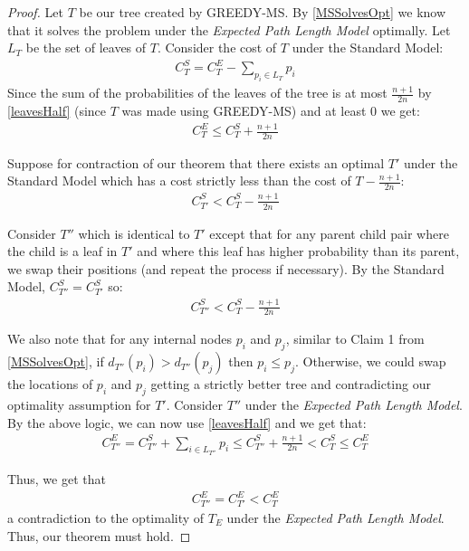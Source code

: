 \documentclass[letterpaper,12pt,titlepage,oneside,final]{book}
\theoremstyle{plain}
\begin{document}
\begin{proof}
Let $T$ be our tree created by GREEDY-MS. By \ref{MSSolvesOpt} we know that it solves the problem under the \textit{Expected Path Length Model} optimally. Let $L_T$ be the set of leaves of $T$. Consider the cost of $T$ under the Standard Model:
\begin{align*}
C^S_T = C^E_T - \sum_{p_i \in L_T} p_i
\end{align*}
Since the sum of the probabilities of the leaves of the tree is at most $\frac{n+1}{2n}$ by \ref{leavesHalf} (since $T$ was made using GREEDY-MS) and at least $0$ we get:
\begin{align*}
C^E_T \leq C^S_T + \frac{n+1}{2n}
\end{align*}

Suppose for contraction of our theorem that there exists an optimal $T'$ under the Standard Model which has a cost strictly less than the cost of $T-\frac{n+1}{2n}$:
\begin{align*}
C^S_{T'} < C^S_T - \frac{n+1}{2n}
\end{align*}

Consider $T''$ which is identical to $T'$ except that for any parent child pair where the child is a leaf in $T'$ and where this leaf has higher probability than its parent, we swap their positions (and repeat the process if necessary). By the Standard Model, $C^S_{T''} = C^S_{T'}$ so:
\begin{align*}
C^S_{T''} < C^S_T - \frac{n+1}{2n}
\end{align*} 

We also note that for any internal nodes $p_i$ and $p_j$, similar to Claim 1 from \ref{MSSolvesOpt}, if $d_{T''}(p_i) > d_{T''}(p_j)$ then $p_i \leq p_j$. Otherwise, we could swap the locations of $p_i$ and $p_j$ getting a strictly better tree and contradicting our optimality assumption for $T'$. Consider $T''$ under the \textit{Expected Path Length Model}. By the above logic, we can now use \ref{leavesHalf} and we get that:
\begin{align*}
C^E_{T''} = C^S_{T''} + \sum_{i \in L_{T''}}p_i \leq C^S_{T''} + \frac{n+1}{2n} < C^S_T \leq C^E_T
\end{align*}

\noindent Thus, we get that
\begin{align*}
C^E_{T''} = C^E_{T'} < C^E_T
\end{align*} 
a contradiction to the optimality of $T_E$ under the \textit{Expected Path Length Model}. Thus, our theorem must hold.

\end{proof}
\end{document}
